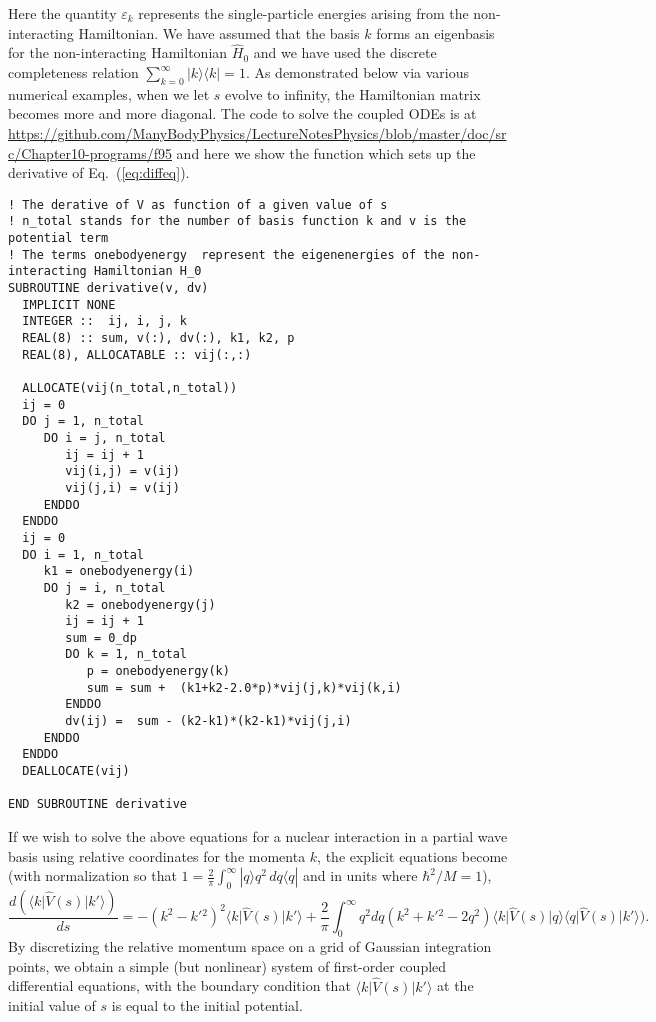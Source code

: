 Here the quantity $\varepsilon_k$ represents the single-particle
energies arising from the non-interacting Hamiltonian. We have assumed
that the basis $k$ forms an eigenbasis for the non-interacting
Hamiltonian $\hat{H}_0$ and we have used the discrete completeness
relation $\sum_{k=0}^{\infty}\vert k \rangle \langle k \vert = 1$.  As
demonstrated below via various numerical examples, when we let $s$
evolve to infinity, the Hamiltonian matrix becomes more and more
diagonal. The code to solve the coupled ODEs is at
\url{https://github.com/ManyBodyPhysics/LectureNotesPhysics/blob/master/doc/src/Chapter10-programs/f95} and here we show the function which sets up the derivative of Eq.~(\ref{eq:diffeq}). 
\begin{lstlisting}
! The derative of V as function of a given value of s
! n_total stands for the number of basis function k and v is the potential term
! The terms onebodyenergy  represent the eigenenergies of the non-interacting Hamiltonian H_0
SUBROUTINE derivative(v, dv)
  IMPLICIT NONE
  INTEGER ::  ij, i, j, k
  REAL(8) :: sum, v(:), dv(:), k1, k2, p
  REAL(8), ALLOCATABLE :: vij(:,:)

  ALLOCATE(vij(n_total,n_total)) 
  ij = 0
  DO j = 1, n_total
     DO i = j, n_total
        ij = ij + 1
        vij(i,j) = v(ij)
        vij(j,i) = v(ij)
     ENDDO
  ENDDO
  ij = 0
  DO i = 1, n_total
     k1 = onebodyenergy(i) 
     DO j = i, n_total
        k2 = onebodyenergy(j) 
        ij = ij + 1
        sum = 0_dp
        DO k = 1, n_total
           p = onebodyenergy(k) 
           sum = sum +  (k1+k2-2.0*p)*vij(j,k)*vij(k,i) 
        ENDDO
        dv(ij) =  sum - (k2-k1)*(k2-k1)*vij(j,i)
     ENDDO
  ENDDO
  DEALLOCATE(vij)

END SUBROUTINE derivative
\end{lstlisting}
If we wish to solve the above equations for a nuclear interaction in a
partial wave basis using relative coordinates for the momenta $k$, the explicit equations
become \cite{Bogner:2007od} (with normalization
so that $1 = \frac{2}{\pi}\int_0^\infty|q\rangle q^2\,dq \langle q |$
and in units where $\hbar^2/M = 1$),
%
\begin{equation}
  \frac{d(\langle k \vert \hat{V}(s) \vert k'\rangle)}{ds} =- (k^2 - k'{}^2)^2\langle k \vert \hat{V}(s) \vert k'\rangle
    + \frac{2}{\pi}\int_0^{\infty}q^2dq
      (k^2 + k'{}^2 - 2q^2)\langle k \vert \hat{V}(s) \vert q\rangle\langle q \vert \hat{V}(s) \vert k'\rangle).
\end{equation}
By discretizing the relative momentum space on a grid of Gaussian integration points, 
we obtain a simple (but nonlinear) system of first-order
coupled differential equations,
with the boundary condition that $\langle k \vert \hat{V}(s) \vert k'\rangle$ at the initial
value of $s$ is equal to the initial potential.

